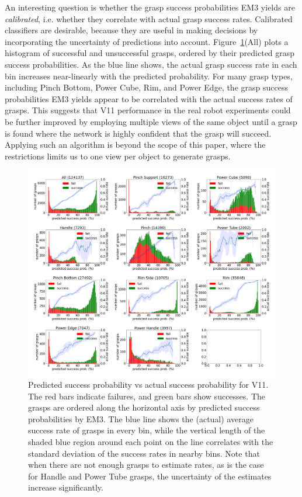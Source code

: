 An interesting question is whether the grasp success probabilities EM3 yields are \textit{calibrated}, i.e. whether they correlate with actual grasp success rates. Calibrated classifiers are desirable, because they are useful in making decisions by incorporating the uncertainty of predictions into account. Figure~\ref{fig:calibrate}(All) plots a histogram of successful and unsuccessful grasps, ordered by their predicted grasp success probabilities. As the blue line shows, the actual grasp success rate in each bin increases near-linearly with the predicted probability. For many grasp types, including Pinch Bottom, Power Cube, Rim, and Power Edge, the grasp success probabilities EM3 yields appear to be correlated with the actual success rates of grasps. This suggests that V11 performance in the real robot experiments could be further improved by employing multiple views of the same object until a grasp is found where the network is highly confident that the grasp will succeed. Applying such an algorithm is beyond the scope of this paper, where the restrictions limits us to one view per object to generate grasps.

\begin{figure}[h]
\centering
\includegraphics[width=1.02\columnwidth]{images/post-analysis/V11_pred_success_vs_success.png}
\caption{Predicted success probability vs actual success probability for V11. The red bars indicate failures, and green bars show successes. The grasps are ordered along the horizontal axis by predicted success probabilities by EM3. The blue line shows the (actual) average success rate of grasps in every bin, while the vertical length of the shaded blue region around each point on the line correlates with the standard deviation of the success rates in nearby bins. Note that when there are not enough grasps to estimate rates, as is the case for Handle and Power Tube grasps, the uncertainty of the estimates increase significantly.}
\label{fig:calibrate}
\end{figure}

